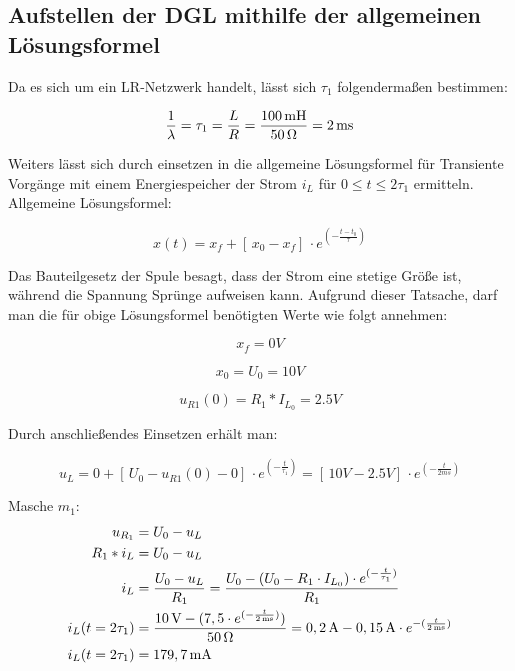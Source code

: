 \documentclass[11pt]{scrartcl}
\begin{document}
\subsection{Aufstellen der DGL mithilfe der allgemeinen Lösungsformel} %

Da es sich um ein LR-Netzwerk handelt, lässt sich $\tau_1$ folgendermaßen bestimmen:

\begin{equation*}
\frac{1}{\lambda} = \tau_{1} = \frac{L}{R} = \frac{100 \,\text{mH}}{50 \,\text{$\Omega$}} = 2 \,\text{ms}
\end{equation*}

Weiters lässt sich durch einsetzen in die allgemeine Lösungsformel für Transiente Vorgänge
mit einem Energiespeicher der Strom $i_L$ für $0 \leq t \leq 2\tau_1$ ermitteln.\\

Allgemeine Lösungsformel:

\begin{equation*}
	x(t) = x_f + [ \, x_0 - x_f ] \, \cdot e^{(-\frac{t-t_0}{\tau})}
\end{equation*}

Das Bauteilgesetz der Spule besagt, dass der Strom eine stetige Größe ist, während die Spannung \glqq Sprünge\grqq{} aufweisen kann. Aufgrund dieser Tatsache, darf man die für obige Lösungsformel benötigten Werte wie folgt annehmen:

\begin{equation*}
	x_f = 0 \unit{V}
\end{equation*}

\begin{equation*}
	x_0 = U_0 = 10 \unit{V}
\end{equation*}

\begin{equation*}
	u_{R1}(0) = R_1 * I_{L_0} = 2.5 \unit{V}
\end{equation*}

Durch anschließendes Einsetzen erhält man:

\begin{equation*}
	u_L = 0 + [ \, U_0 - u_{R1}(0) - 0 ] \, \cdot e^{(-\frac{t}{\tau_1})} = [ \, 10 \unit{V} - 2.5 \unit{V} ] \, \cdot e^{(-\frac{t}{2 \unit{ms}})}
\end{equation*}

Masche $m_1$:
\begin{align*}
	u_{R_1} &= U_0 - u_L\\
	R_1 * i_L &= U_0 - u_L\\
	i_L &= \frac{U_0 - u_L}{R_1} = \frac{U_0 - (U_0 - R_1 \cdot I_{L_0}) \cdot e^{(-\frac{t}{\tau_1})}}{R_1} \\
	i_L (t = 2 \tau_1) &= \frac{10\,\text{V} - (7,5 \cdot e^{(-\frac{t}{2 \,\text{ms}})})}{50 \,\text{$\Omega$}} = 0,2 \,\text{A} - 0,15 \,\text{A} \cdot e^{-(\frac{t}{2 \,\text{ms}})} \\
	i_L (t = 2 \tau_1) &= 179,7 \,\text{mA}
\end{align*}
\end{document}
